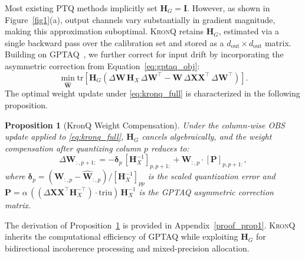 \documentclass{article} %
\newtheorem{proposition}{Proposition}
\newcommand{\KronQ}{\textsc{KronQ}}
\begin{document}
Most existing PTQ methods implicitly set $\mathbf{H}_G = \mathbf{I}$. However, as shown in Figure~\ref{fig1}(a), output channels vary substantially in gradient magnitude, making this approximation suboptimal. \KronQ{} retains $\mathbf{H}_G$, estimated via a single backward pass over the calibration set and stored as a $d_{\mathrm{out}} \times d_{\mathrm{out}}$ matrix. Building on GPTAQ~\citep{li2025gptaq}, we further correct for input drift by incorporating the asymmetric correction from Equation~\eqref{eq:gptaq_obj}:
\begin{equation}
    \min_{\widehat{\mathbf{W}}} \mathrm{tr}\!\left[\mathbf{H}_G\!\left(
\Delta\mathbf{W}\,\mathbf{H}_X\,\Delta\mathbf{W}^\top 
- \mathbf{W}\,\Delta\mathbf{X}\mathbf{X}^\top\,\Delta\mathbf{W}^\top
\right)\right].
    \label{eq:kronq_full}
\end{equation}
The optimal weight update under \eqref{eq:kronq_full} is characterized in the following proposition.

\begin{proposition}[KronQ Weight Compensation]
\label{prop:hg_cancel}
Under the column-wise OBS update applied to \eqref{eq:kronq_full}, $\mathbf{H}_G$ cancels algebraically, and the weight compensation after quantizing column $p$ reduces to:
\begin{equation}
    \Delta\mathbf{W}_{:,p+1:}
    = -\boldsymbol{\delta}_p\, [\mathbf{H}_X^{-1}]_{p,p+1:}
    + \mathbf{W}_{:,p} \cdot [\mathbf{P}]_{p,p+1:},
    \label{eq:kronq_update}
\end{equation}
where $\boldsymbol{\delta}_p = (\mathbf{W}_{:,p} - \widehat{\mathbf{W}}_{:,p})/[\mathbf{H}_X^{-1}]_{pp}$ is the scaled quantization error and $\mathbf{P} = \alpha\,((\Delta\mathbf{X}\mathbf{X}^\top \mathbf{H}_X^{-\top}) \cdot \mathrm{triu})\,\mathbf{H}_X^{-1}$ is the GPTAQ asymmetric correction matrix.
\end{proposition}
The derivation of Proposition~\ref{prop:hg_cancel} is provided in Appendix~\ref{proof_prop1}. \KronQ{} inherits the computational efficiency of GPTAQ while exploiting $\mathbf{H}_G$ for bidirectional incoherence processing and mixed-precision allocation.
 
\end{document}
